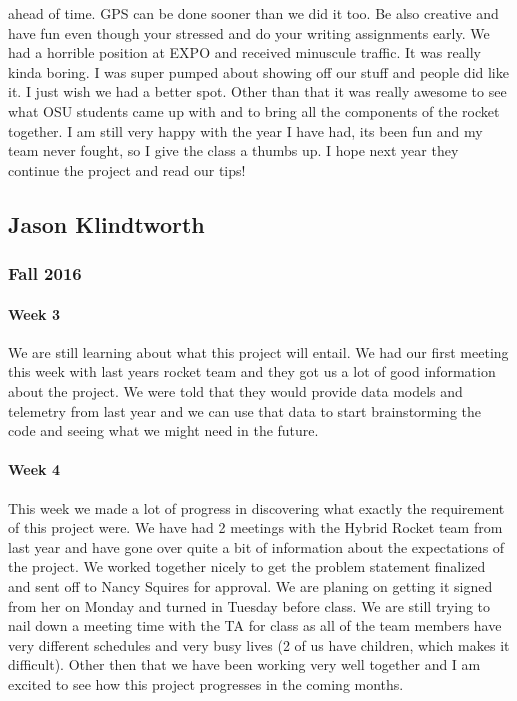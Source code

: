 \documentclass[10pt,draftclsnofoot,onecolumn,retainorgcmds]{IEEEtran}
\begin{document}
ahead of time. GPS can be done sooner than we did it too. Be also creative and have fun even though your stressed and do your writing assignments early. We had a horrible position at EXPO and received minuscule traffic. It was really kinda boring. I was super pumped about showing off our stuff and people did like it. I just wish we had a better spot. Other than that it was really awesome to see what OSU students came up with and to bring all the components of the rocket together. I am still very happy with the year I have had, its been fun and my team never fought, so I give the class a thumbs up. I hope next year they continue the project and read our tips!\\

\subsection{Jason Klindtworth}
\subsubsection{Fall 2016}
\paragraph{Week 3}
We are still learning about what this project will entail. We had our first meeting this week with last years rocket team and they got us a lot of good information about the project. We were told that they would provide data models and telemetry from last year and we can use that data to start brainstorming the code and seeing what we might need in the future.\\
\paragraph{Week 4}
This week we made a lot of progress in discovering what exactly the requirement of this project were. We have had 2 meetings with the Hybrid Rocket team from last year and have gone over quite a bit of information about the expectations of the project. We worked together nicely to get the problem statement finalized and sent off to Nancy Squires for approval. We are planing on getting it signed from her on Monday and turned in Tuesday before class. We are still trying to nail down a meeting time with the TA for class as all of the team members have very different schedules and very busy lives (2 of us have children, which makes it difficult). Other then that we have been working very well together and I am excited to see how this project progresses in the coming months.\\
\end{document}
